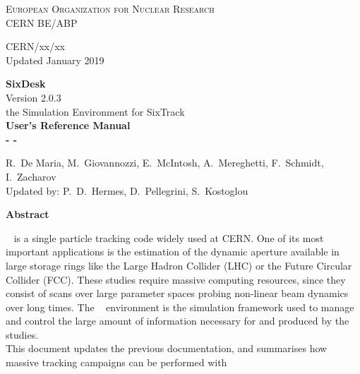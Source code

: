 \begin{titlepage}
\begin{center}\normalsize\scshape
    European Organization for Nuclear Research \\
    CERN BE/ABP
\end{center}
\vspace*{2mm}
\begin{flushright}
    CERN/xx/xx \\
    Updated January 2019
\end{flushright}
\begin{center}\Huge
    \textbf{SixDesk} \\
    \LARGE Version 2.0.3 \\
    \vspace*{8mm} the Simulation Environment for SixTrack\\
    \vspace*{8mm}\textbf{User's Reference Manual}\\
    \vspace*{8mm}\textbf{- \whichSixTrack{} -}
\end{center}
\begin{center}
    \vspace*{2mm}
  R.~De Maria, M.~Giovannozzi, E.~McIntosh, A.~Mereghetti, F.~Schmidt,
  I.~Zacharov \\
    \vspace*{2mm}Updated by:
    P.~D.~Hermes, D.~Pellegrini, S.~Kostoglou
\end{center}
\begin{center}\large
    \vspace*{10mm}\textbf{Abstract} \\
\end{center}
\SIXTRACK{}~\cite{SixTrack_user_manual,SixPub,sixtrackWeb}
is a single particle tracking code widely used at CERN. One of its
most important applications is the estimation of the dynamic aperture available
in large storage rings like the Large Hadron Collider (LHC) or the Future
Circular Collider (FCC). These studies require massive computing resources,
since they consist of scans over large parameter spaces probing non-linear beam
dynamics over long times.
The \SIXDESK{}~\cite{SixDesk_original,SixDesk_updated} environment is the
simulation framework used to manage and control the large amount of
information necessary for and produced by the studies. \\
This document updates the previous documentation, and summarises how massive
tracking campaigns can be performed with \SIXTRACK{}

\end{titlepage}
